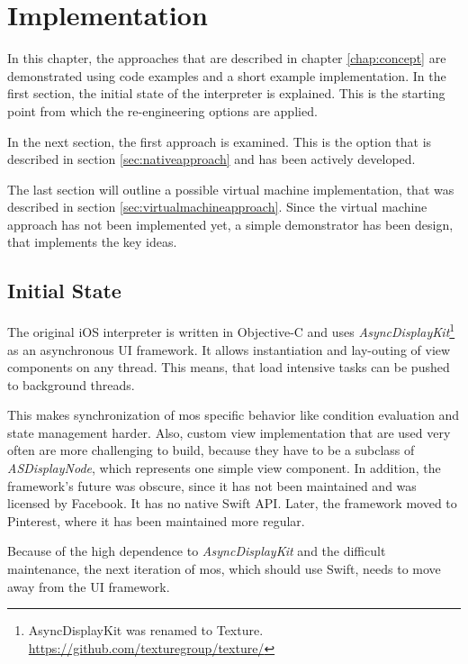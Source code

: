 
\chapter{Implementation}
\label{chap:implementation}

In this chapter, the approaches that are described in chapter \ref{chap:concept} are demonstrated using code examples and a short example implementation.
In the first section, the initial state of the interpreter is explained.
This is the starting point from which the re-engineering options are applied.

In the next section, the first approach is examined.
This is the option that is described in section \ref{sec:nativeapproach} and has been actively developed.

The last section will outline a possible virtual machine implementation, that was described in section \ref{sec:virtualmachineapproach}.
Since the virtual machine approach has not been implemented yet, a simple demonstrator has been design, that implements the key ideas.


\section{Initial State}
\label{sec:initialstate}

The original iOS interpreter is written in Objective-C and uses \textit{AsyncDisplayKit}\footnote{AsyncDisplayKit was renamed to Texture. \url{https://github.com/texturegroup/texture/}} as an asynchronous \ac{UI} framework.
It allows instantiation and lay-outing of view components on any thread.
This means, that load intensive tasks can be pushed to background threads.

This makes synchronization of \ac{mos} specific behavior like condition evaluation and state management harder.
Also, custom view implementation that are used very often are more challenging to build, because they have to be a subclass of \textit{ASDisplayNode}, which represents one simple view component.
In addition, the framework's future was obscure, since it has not been maintained and was licensed by Facebook.
It has no native Swift \ac{API}.
Later, the framework moved to Pinterest, where it has been maintained more regular.

Because of the high dependence to \textit{AsyncDisplayKit} and the difficult maintenance, the next iteration of \ac{mos}, which should use Swift, needs to move away from the \ac{UI} framework.

